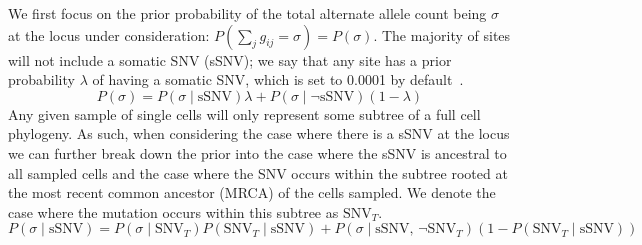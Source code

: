 \documentclass[../../main.tex]{subfiles}
\begin{document}
We first focus on the prior probability of the total alternate allele count being $\sigma$ at the locus under consideration: $P(\sum_j g_{ij}=\sigma)=P(\sigma)$.
The majority of sites will not include a somatic SNV (sSNV); we say that any site has a prior probability $\lambda$ of having a somatic SNV, which is set to 0.0001 by default~\cite{monovar, sciphi}.
\begin{equation} \label{eq:overallprior}
P(\sigma)=P(\sigma\mid\text{sSNV})\lambda+P(\sigma\mid\neg\text{sSNV})(1-\lambda)
\end{equation}
Any given sample of single cells will only represent some subtree of a full cell phylogeny.
As such, when considering the case where there is a sSNV at the locus we can further break down the prior into the case where the sSNV is ancestral to all sampled cells and the case where the SNV occurs within the subtree rooted at the most recent common ancestor (MRCA) of the cells sampled.
We denote the case where the mutation occurs within this subtree as $\text{SNV}_T$.
\begin{equation} \label{eq:somaticsnv}
P(\sigma\mid\text{sSNV})=P(\sigma\mid \text{SNV}_T)P(\text{SNV}_T\mid \text{sSNV})+P(\sigma\mid \text{sSNV},\,\neg\text{SNV}_T)(1-P(\text{SNV}_T\mid \text{sSNV}))
\end{equation}
\end{document}
